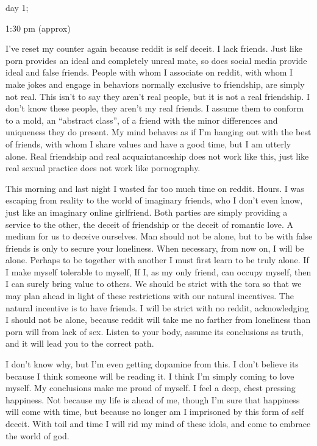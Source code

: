 day 1;

1:30 pm (approx)

I've reset my counter again because reddit is self deceit. I lack
friends. Just like porn provides an ideal and completely unreal mate, so
does social media provide ideal and false friends. People with whom I
associate on reddit, with whom I make jokes and engage in behaviors
normally exclusive to friendship, are simply not real. This isn't to say
they aren't real people, but it is not a real friendship. I don't know
these people, they aren't my real friends. I assume them to conform to a
mold, an ``abstract class'', of a friend with the minor differences and
uniqueness they do present. My mind behaves as if I'm hanging out with
the best of friends, with whom I share values and have a good time, but
I am utterly alone. Real friendship and real acquaintanceship does not
work like this, just like real sexual practice does not work like
pornography.

This morning and last night I wasted far too much time on reddit. Hours.
I was escaping from reality to the world of imaginary friends, who I
don't even know, just like an imaginary online girlfriend. Both parties
are simply providing a service to the other, the deceit of friendship or
the deceit of romantic love. A medium for us to deceive ourselves. Man
should not be alone, but to be with false friends is only to secure your
loneliness. When necessary, from now on, I will be alone. Perhaps to be
together with another I must first learn to be truly alone. If I make
myself tolerable to myself, If I, as my only friend, can occupy myself,
then I can surely bring value to others. We should be strict with the
tora so that we may plan ahead in light of these restrictions with our
natural incentives. The natural incentive is to have friends. I will be
strict with no reddit, acknowledging I should not be alone, because
reddit will take me no farther from loneliness than porn will from lack
of sex. Listen to your body, assume its conclusions as truth, and it
will lead you to the correct path.

I don't know why, but I'm even getting dopamine from this. I don't
believe its because I think someone will be reading it. I think I'm
simply coming to love myself. My conclusions make me proud of myself. I
feel a deep, chest pressing happiness. Not because my life is ahead of
me, though I'm sure that happiness will come with time, but because no
longer am I imprisoned by this form of self deceit. With toil and time I
will rid my mind of these idols, and come to embrace the world of god.

